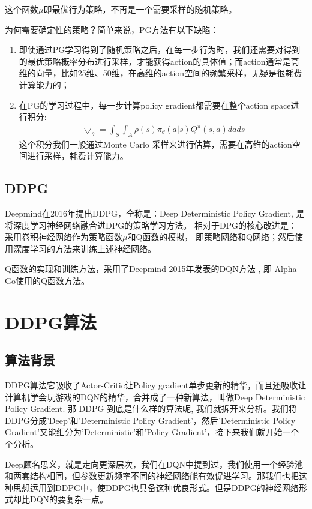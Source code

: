 \documentclass[12pt]{article}
\begin{document}
 这个函数$\mu$即最优行为策略，不再是一个需要采样的随机策略。

 为何需要确定性的策略？简单来说，PG方法有以下缺陷：
 \begin{enumerate}
	\item 即使通过PG学习得到了随机策略之后，在每一步行为时，我们还需要对得到的最优策略概率分布进行采样，才能获得action的具体值；而action通常是高维的向量，比如25维、50维，在高维的action空间的频繁采样，无疑是很耗费计算能力的；
	\item 在PG的学习过程中，每一步计算policy gradient都需要在整个action space进行积分:
	\begin{align}
		\bigtriangledown _\theta=\int_S\int_A\rho(s)\pi_\theta(a|s)Q^\pi(s,a)dads
	\end{align}
	这个积分我们一般通过Monte Carlo 采样来进行估算，需要在高维的action空间进行采样，耗费计算能力。
 \end{enumerate}


\subsection{DDPG}

Deepmind在2016年提出DDPG，全称是：Deep Deterministic Policy Gradient,
是将深度学习神经网络融合进DPG的策略学习方法。
相对于DPG的核心改进是： 采用卷积神经网络作为策略函数$\mu$和Q函数的模拟，
即策略网络和Q网络；然后使用深度学习的方法来训练上述神经网络。

Q函数的实现和训练方法，采用了Deepmind 2015年发表的DQN方法 ,
即 Alpha Go使用的Q函数方法。


\section{DDPG算法}
\subsection{算法背景}

DDPG算法它吸收了Actor-Critic让Policy gradient单步更新的精华，而且还吸收让计算机学会玩游戏的DQN的精华，合并成了一种新算法，叫做Deep Deterministic Policy Gradient. 那 DDPG 到底是什么样的算法呢, 我们就拆开来分析。我们将DDPG分成'Deep'和'Deterministic Policy Gradient'，然后'Deterministic Policy Gradient'又能细分为'Deterministic'和'Policy Gradient'，接下来我们就开始一个个分析。

Deep顾名思义，就是走向更深层次，我们在DQN中提到过，我们使用一个经验池和两套结构相同，但参数更新频率不同的神经网络能有效促进学习。那我们也把这种思想运用到DDPG中，使DDPG也具备这种优良形式。但是DDPG的神经网络形式却比DQN的要复杂一点。
\end{document}
